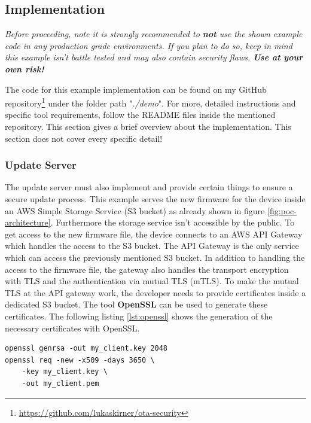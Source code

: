 \subsection{Implementation}\label{subsec:implementation}

\textit{
Before proceeding, note it is strongly recommended to \textbf{not} use the shown example code in any production grade environments. If you plan to do so, keep in mind this example isn't battle tested and may also contain security flaws. \textbf{Use at your own risk!}}

\vspace{\baselineskip}
The code for this example implementation can be found on my GitHub repository\footnote{\url{https://github.com/lukaskirner/ota-security}} under the folder path "\textit{./demo}". For more, detailed instructions and specific tool requirements, follow the README files inside the mentioned repository. This section gives a brief overview about the implementation. This section does not cover every specific detail!

\subsubsection{Update Server}
The update server must also implement and provide certain things to ensure a secure update process. This example serves the new firmware for the device inside an AWS Simple Storage Service (S3 bucket) as already shown in figure \ref{fig:poc-architecture}. Furthermore the storage service isn't accessible by the public. To get access to the new firmware file, the device connects to an AWS API Gateway which handles the access to the S3 bucket. The API Gateway is the only service which can access the previously mentioned S3 bucket. In addition to handling the access to the firmware file, the gateway also handles the transport encryption with TLS and the authentication via mutual TLS (mTLS). To make the mutual TLS at the API gateway work, the developer needs to provide certificates inside a dedicated S3 bucket. The tool \textbf{OpenSSL} can be used to generate these certificates. The following listing \ref{lst:openssl} shows the generation of the necessary certificates with OpenSSL.

\vspace{10pt}
\begin{lstlisting}[caption={Generating certificates wiht OpenSSL},label={lst:openssl},captionpos=b,frame=single]
openssl genrsa -out my_client.key 2048
openssl req -new -x509 -days 3650 \
    -key my_client.key \
    -out my_client.pem
\end{lstlisting}

